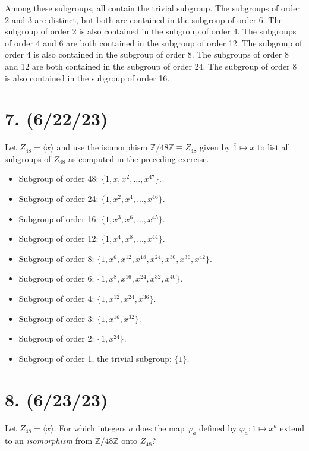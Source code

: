 \documentclass{article}
\begin{document}
Among these subgroups, all contain the trivial subgroup. The subgroups of order 2 and 3 are distinct, but both are contained in the subgroup of order 6. The subgroup of order 2 is also contained in the subgroup of order 4. The subgroups of order 4 and 6 are both contained in the subgroup of order 12. The subgroup of order 4 is also contained in the subgroup of order 8. The subgroups of order 8 and 12 are both contained in the subgroup of order 24. The subgroup of order 8 is also contained in the subgroup of order 16.

\section*{7. (6/22/23)}

Let $Z_{48} = \langle x \rangle$ and use the isomorphism $\mathbb{Z}/48\mathbb{Z} \equiv Z_{48}$ given by $\overline{1} \mapsto x$ to list all subgroups of $Z_{48}$ as computed in the preceding exercise.

\begin{itemize}[itemsep=0em]
    \item Subgroup of order 48: $\{ 1, x, x^2, ..., x^{47} \}$.
    \item Subgroup of order 24: $\{ 1, x^2, x^4, ..., x^{46} \}$.
    \item Subgroup of order 16: $\{ 1, x^3, x^6, ..., x^{45} \}$.
    \item Subgroup of order 12: $\{ 1, x^4, x^8, ..., x^{44} \}$.
    \item Subgroup of order 8: $\{ 1, x^6, x^{12}, x^{18}, x^{24}, x^{30}, x^{36}, x^{42} \}$.
    \item Subgroup of order 6: $\{ 1, x^8, x^{16}, x^{24}, x^{32}, x^{40} \}$.
    \item Subgroup of order 4: $\{ 1, x^{12}, x^{24}, x^{36} \}$.
    \item Subgroup of order 3: $\{ 1, x^{16}, x^{32} \}$.
    \item Subgroup of order 2: $\{ 1, x^{24} \}$.
    \item Subgroup of order 1, the trivial subgroup: $\{ 1 \}$.
\end{itemize}

\section*{8. (6/23/23)}

Let $Z_{48} = \langle x \rangle$. For which integers $a$ does the map $\varphi_a$ defined by $\varphi_a: \overline{1} \mapsto x^a$ extend to an \emph{isomorphism} from $\mathbb{Z}/48\mathbb{Z}$ onto $Z_{48}$?
\end{document}
